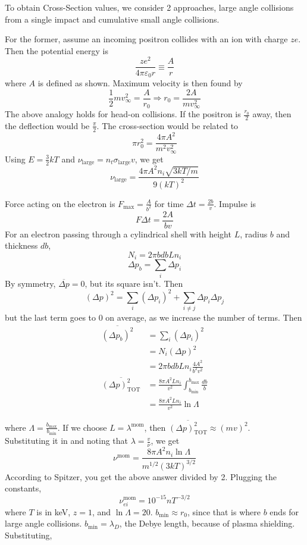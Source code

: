 \documentclass[12pt]{article}
\begin{document}
To obtain Cross-Section values, we consider 2 approaches, large angle collisions from a single impact and cumulative small angle collisions.

For the former, assume an incoming positron collides with an ion with charge $ze$. Then the potential energy is
$$\frac{ze^2}{4\pi\varepsilon_0r} \equiv \frac{A}{r}$$
where $A$ is defined as shown. Maximum velocity is then found by
$$\frac{1}{2}mv_\infty^2 = \frac{A}{r_0} \Rightarrow r_0 = \frac{2A}{mv_\infty^2}$$
The above analogy holds for head-on collisions. If the positron is $\frac{r_0}{2}$ away, then the deflection would be $\frac{\pi}{2}$. The cross-section would be related to
$$\pi r_0^2 = \frac{4\pi A^2}{m^2v_\infty^2}$$
Using $E = \frac{3}{2}kT$ and $\nu_{\text{large}} = n_t\sigma_{\text{large}}v$, we get
$$\nu_{\text{large}} = \frac{4\pi A^2n_i\sqrt{3kT/m}}{9(kT)^2}$$

Force acting on the electron is $F_{\text{max}} = \frac{A}{b^2}$ for time $\Delta t = \frac{2b}{v}$. Impulse is
$$F\Delta t = \frac{2A}{bv}$$
For an electron passing through a cylindrical shell with height $L$, radius $b$ and thickness $db$,
$$N_i = 2\pi b dbLn_i$$
$$\Delta p_b = \sum_i \Delta p_i$$
By symmetry, $\overline{\Delta p} = 0$, but its square isn't. Then
$$(\Delta p)^2 = \sum_i (\Delta p_i)^2 + \sum_{i\neq j} \Delta p_i\Delta p_j$$
but the last term goes to 0 on average, as we increase the number of terms. Then
\begin{align*}
    \overline{(\Delta p_b)^2} &= \sum_i (\Delta p_i)^2 \\
                              &= N_i (\Delta p)^2 \\
                              &= 2\pi bdbLn_i \frac{4A^2}{b^2v^2} \\
    \overline{(\Delta p)^2_{\text{TOT}}} &= \frac{8\pi A^2Ln_i}{v^2} \int_{b_{\text{min}}}^{b_{\text{max}}} \frac{db}{b} \\
                                         &= \frac{8\pi A^2Ln_i}{v^2}\ln \Lambda
\end{align*}

where $\Lambda = \frac{b_{\text{max}}}{b_{\text{min}}}$. If we choose $L = \lambda^{\text{mom}}$, then $\overline{(\Delta p)^2_{\text{TOT}}} \approx (mv)^2$. \\
Substituting it in and noting that $\lambda = \frac{v}{\nu}$, we get
$$\nu^{\text{mom}} = \frac{8\pi A^2n_i\ln\Lambda}{m^{1/2}(3kT)^{3/2}}$$
According to Spitzer, you get the above answer divided by 2. Plugging the constants,
$$\nu_{ei}^{\text{mom}} = 10^{-15}nT^{-3/2}$$
where $T$ is in keV, $z=1$, and $\ln\Lambda=20$. $b_{\text{min}} \approx r_0$, since that is where $b$ ends for large angle collisions. $b_{\text{min}} = \lambda_D$, the Debye length, because of plasma shielding. Substituting,
\end{document}
